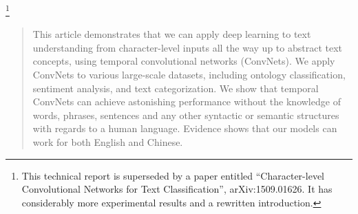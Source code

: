 \documentclass{article}
\newcommand\blfootnote[1]{%
  \begingroup
  \renewcommand\thefootnote{}\footnote{#1}%
  \addtocounter{footnote}{-1}%
  \endgroup
}
\begin{document}
\begin{CJK}{UTF8}{gbsn}

%  
%
%
%
%  
%


\blfootnote{This technical report is superseded by a paper entitled ``Character-level Convolutional Networks for Text Classification'', arXiv:1509.01626. It has considerably more experimental results and a rewritten introduction.}

\begin{abstract} 
This article demonstrates that we can apply deep learning to text understanding from character-level inputs all the way up to abstract text concepts, using temporal convolutional networks\cite{LBBH98} (ConvNets). We apply ConvNets to various large-scale datasets, including ontology classification, sentiment analysis, and text categorization. We show that temporal ConvNets can achieve astonishing performance without the knowledge of words, phrases, sentences and any other syntactic or semantic structures with regards to a human language. Evidence shows that our models can work for both English and Chinese.
\end{abstract} 


\end{CJK}
\end{document}
